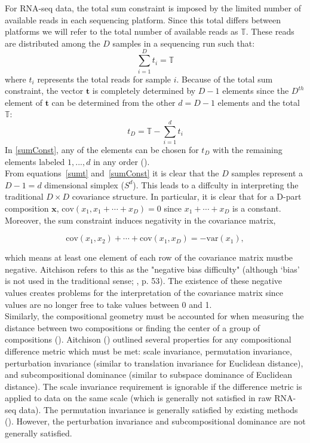 \documentclass{article}\usepackage[]{graphicx}\usepackage[]{color}
\begin{document}
For RNA-seq data, the total sum constraint is imposed by the limited number of available reads in each sequencing platform.  Since this total differs between platforms we will refer to the total number of available reads as $\mathbb{T}$. These reads are distributed among the $D$ samples in a sequencing run such that:
\begin{equation}
\sum_{i=1}^{D} t_i = \mathbb{T}
\label{sumt}
\end{equation}
where $t_i$ represents the total reads for sample $i$.  Because of the total sum constraint, the vector $\mathbf{t}$ is completely determined by $D-1$ elements since the $D^{th}$ element of $\mathbf{t}$ can be determined from the other $d = D-1$ elements and the total $\mathbb{T}$:  
\begin{equation}
t_D = \mathbb{T} - \sum_{i=1}^{d} t_i
\label{sumConst}
\end{equation}
In \ref{sumConst}, any of the elements can be chosen for $t_D$ with the remaining elements labeled $1, ..., d$ in any order (\cite{Aitchison1986}).  \\

From equations~\ref{sumt} and~\ref{sumConst} it is clear that the $D$ samples represent a $D - 1 = d$ dimensional simplex ($S^d$). This leads to a diffculty in interpreting the traditional $D \times D$ covariance structure.  In particular, it is clear that for a D-part composition $\mathbf{x}$, $\text{cov}(x_1, x_1+ \cdots +x_D) = 0$  since $x_1 + \cdots + x_D$ is a constant.  Moreover, the sum constraint induces negativity in the covariance matrix,

\begin{equation}
\text{cov}(x_1, x_2) + \cdots + \text{cov}(x_1, x_D) = -\text{var}(x_1),
\label{negbias}
\end{equation}

which means at least one element of each row of the covariance matrix mustbe negative. Aitchison refers to this as the "negative bias difficulty" (although `bias' is not used in the traditional sense; \cite{Aitchison1986}, p. 53). The existence of these negative values creates problems for the interpretation of the covariance matrix since values are no longer free to take values between 0 and 1.\\

Similarly, the compositional geometry must be accounted for when measuring the distance between two compositions or finding the center of a group of compositions (\cite{Aitchison2000}).  Aitchison (\cite{Aitchison1992}) outlined several properties for any compositional difference metric which must be met: scale invariance, permutation invariance, perturbation invariance (similar to translation invariance for Euclidean distance), and subcompositional dominance (similar to subspace dominance of Euclidean distance).  The scale invariance requirement is ignorable if the difference metric is applied to data on the same scale (which is generally not satisfied in raw RNA-seq data). The permutation invariance is generally satisfied by existing methods (\cite{Martin-Fernandez1998}). However, the perturbation invariance and subcompositional dominance are not generally satisfied. \\
\end{document}
